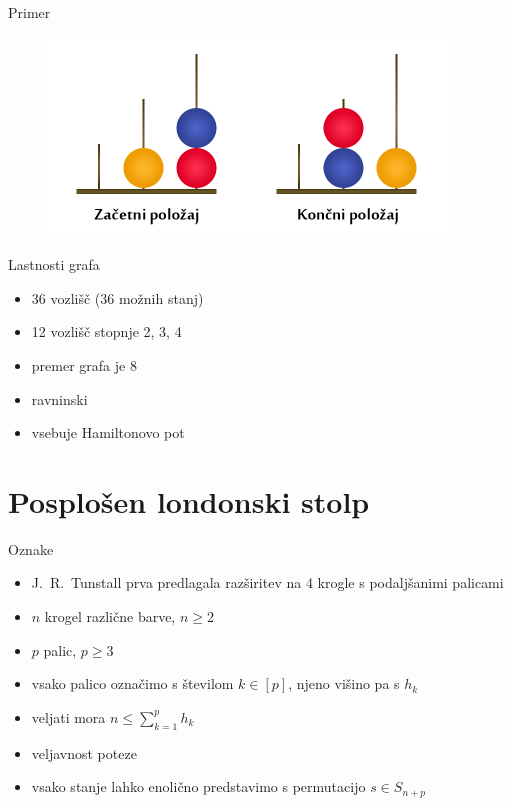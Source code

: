 \documentclass{beamer}
\begin{document}
\begin{frame}{Primer}
    \begin{figure}
        \centering
        \includegraphics[height=150pt]{../img/london-tower.png}
    \end{figure}
\end{frame}

\begin{frame}{Lastnosti grafa}
    \begin{itemize}
        \item 36 vozlišč (36 možnih stanj)
        \item 12 vozlišč stopnje 2, 3, 4
        \item premer grafa je 8
        \item ravninski
        \item vsebuje Hamiltonovo pot
    \end{itemize}
\end{frame}

\section{Posplošen londonski stolp}
\begin{frame}{Oznake}
    \begin{itemize}
        \item J.\ R.\ Tunstall prva predlagala razširitev na 4 krogle s podaljšanimi palicami
        \item $n$ krogel različne barve, $n \geq 2$
        \item $p$ palic, $p \geq 3$
        \item vsako palico označimo s številom $k \in [p]$, njeno višino pa s $h_k$
        \item veljati mora $n \leq \sum_{k=1}^p h_k$
        \item veljavnost poteze
        \item vsako stanje lahko enolično predstavimo s permutacijo $s \in S_{n+p}$
    \end{itemize}
\end{frame}
\end{document}
